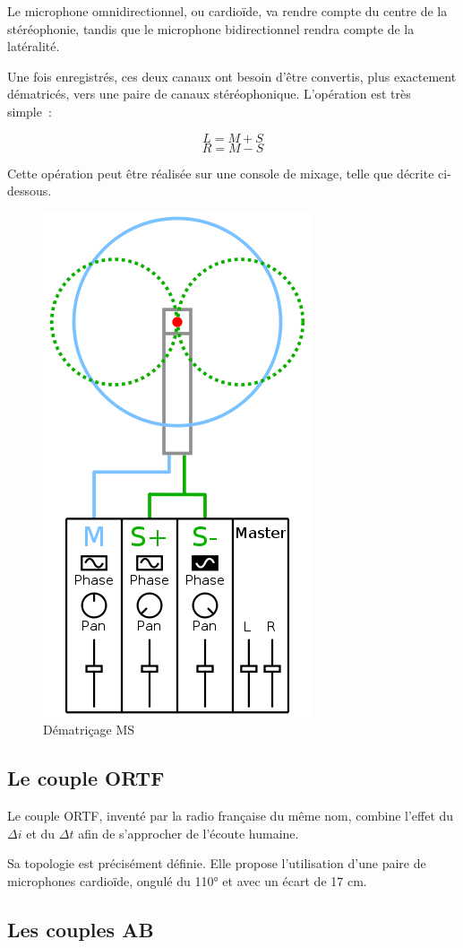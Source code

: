 \documentclass[
]{book}
\begin{document}
Le microphone omnidirectionnel, ou cardioïde, va rendre compte du centre de la stéréophonie, tandis que le microphone bidirectionnel rendra compte de la latéralité.

Une fois enregistrés, ces deux canaux ont besoin d'être convertis, plus exactement dématricés, vers une paire de canaux stéréophonique. L'opération est très simple~:

\[L = M+S\]
\[R = M-S\]

Cette opération peut être réalisée sur une console de mixage, telle que décrite ci-dessous.

\begin{figure}
\includegraphics[width=0.4\linewidth]{_resources/171f157be4749ac8446dd9bdfff0625b} \caption{Dématriçage MS}\label{fig:chunk-label}
\end{figure}

\hypertarget{le-couple-ortf}{%
\subsection{Le couple ORTF}\label{le-couple-ortf}}

Le couple ORTF, inventé par la radio française du même nom, combine l'effet du \(\Delta i\) et du \(\Delta t\) afin de s'approcher de l'écoute humaine.

Sa topologie est précisément définie. Elle propose l'utilisation d'une paire de microphones cardioïde, ongulé du 110° et avec un écart de 17 cm.

\hypertarget{les-couples-ab}{%
\subsection{Les couples AB}\label{les-couples-ab}}
\end{document}
